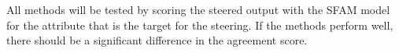All methods will be tested by scoring the steered output with the SFAM model for the attribute that is the target for the steering. If the methods perform well, there should be a significant difference in the agreement score.



